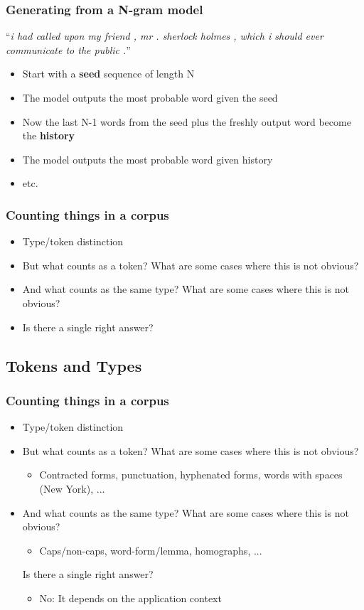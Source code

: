 \documentclass{beamer}
\begin{document}
\begin{frame}
\frametitle{Generating from a N-gram model}
``{\it i had called upon my friend , mr . sherlock holmes , which i should ever communicate to the public .}''

\vspace{0.5cm}

\begin{itemize}
	\item Start with a {\bf seed} sequence of length N
	\item The model outputs the most probable word given the seed
	\item Now the last N-1 words from the seed plus the freshly output word become the {\bf history}
	\item The model outputs the most probable word given history
	\item etc.
\end{itemize}
\end{frame}
\begin{frame}
\frametitle{Counting things in a corpus}
\begin{itemize}
\item Type/token distinction
\item But what counts as a token?  What are some cases where this is not obvious? 
\item And what counts as the same type?  What are some cases where this is not obvious?
\item Is there a single right answer?
\end{itemize}
\end{frame}

\subsection{Tokens and Types}
\begin{frame}
\frametitle{Counting things in a corpus}
\begin{itemize}
\item Type/token distinction
\item But what counts as a token?  What are some cases where this is not obvious? 
\begin{itemize}
\item Contracted forms, punctuation, hyphenated forms, words with spaces (New York), ...
\end{itemize}
\item And what counts as the same type?  What are some cases where this is not obvious?
\begin{itemize}
\item Caps/non-caps, word-form/lemma, homographs, ...
\end{itemize}
Is there a single right answer?
\begin{itemize}
\item No: It depends on the application context
\end{itemize}
\end{itemize}
\end{frame}
\end{document}
